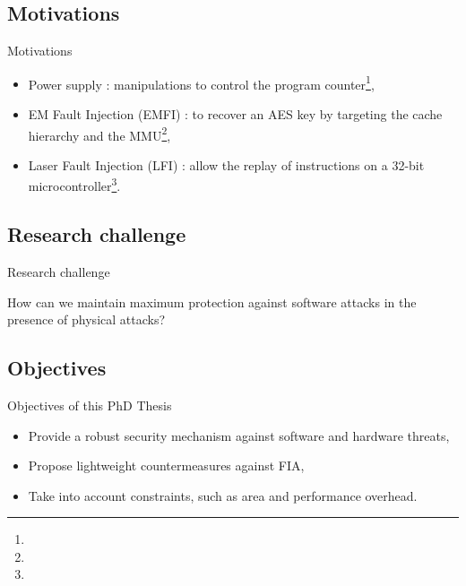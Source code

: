 \subsection{Motivations}
\begin{frame}{Motivations}
    \begin{block}{}
        \begin{itemize}
            \item Power supply : manipulations to control the program counter\footnote[frame]{\tiny{}},
            \item EM Fault Injection (EMFI) : to recover an AES key by targeting the cache hierarchy and the MMU\footnote[frame]{\tiny{}},
            \item Laser Fault Injection (LFI) : allow the replay of instructions on a 32-bit microcontroller\footnote[frame]{\tiny{}}.
        \end{itemize}
    \end{block}
\end{frame}
\subsection{Research challenge}
\begin{frame}{Research challenge}
    \begin{exampleblock}{}
        How can we maintain maximum protection against software attacks in the presence of physical attacks?
    \end{exampleblock}
\end{frame}
\subsection{Objectives}
\begin{frame}{Objectives of this PhD Thesis}
    \begin{block}{}
        \begin{itemize}
            [triangle]
            \justifying
            \item Provide a robust security mechanism against software and hardware threats,
            \item Propose lightweight countermeasures against FIA,
            \item Take into account constraints, such as area and performance overhead.
        \end{itemize}
    \end{block}
\end{frame}

